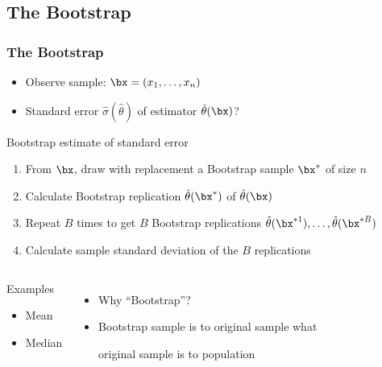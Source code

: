 \subsection{The Bootstrap}

\begin{frame}
	\frametitle{The Bootstrap}
	\begin{itemize}
		\item Observe sample: $\bx = (x_1, \dots, x_n)$
		\item Standard error $\hat \sigma(\hat\theta)$ of estimator $\hat\theta(\bx)$? 
	\end{itemize}
	
	\begin{block}{Bootstrap estimate of standard error}
		\begin{enumerate}
			\item From $\bx$, draw with replacement a \alert{Bootstrap sample} $\bx^*$ of size $n$ 
			\item Calculate \alert{Bootstrap replication} $\hat \theta(\bx^*)$ of $\hat\theta(\bx)$
			\item Repeat $B$ times to get $B$ Bootstrap replications $\hat \theta(\bx^{*1}), \dots, \hat \theta(\bx^{*B})$
			\item Calculate \alert{sample standard deviation} of the $B$ replications
		\end{enumerate}
	\end{block}
	
	\begin{columns}[onlytextwidth]
		\begin{exampleblock}{Examples}
		\begin{itemize}
			\item Mean
			\item Median
		\end{itemize}
		\end{exampleblock}

	\begin{itemize}
		\item Why ``Bootstrap''?
		\item Bootstrap sample is to original sample what 
		
		original sample is to population
	\end{itemize}
	\end{columns}
\end{frame}


